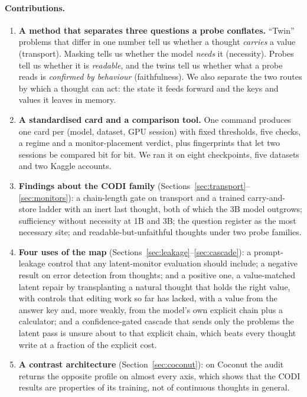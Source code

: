 \documentclass{article}
\begin{document}
\paragraph{Contributions.}
\begin{enumerate}
  \item \textbf{A method that separates three questions a probe conflates.} ``Twin'' problems that differ in one number tell us whether a thought \emph{carries} a value (transport). Masking tells us whether the model \emph{needs} it (necessity). Probes tell us whether it is \emph{readable}, and the twins tell us whether what a probe reads is \emph{confirmed by behaviour} (faithfulness). We also separate the two routes by which a thought can act: the state it feeds forward and the keys and values it leaves in memory.
  \item \textbf{A standardised card and a comparison tool.} One command produces one card per (model, dataset, GPU session) with fixed thresholds, five checks, a regime and a monitor-placement verdict, plus fingerprints that let two sessions be compared bit for bit. We ran it on eight checkpoints, five datasets and two Kaggle accounts.
  \item \textbf{Findings about the CODI family} (Sections~\ref{sec:transport}--\ref{sec:monitors}): a chain-length gate on transport and a trained carry-and-store ladder with an inert last thought, both of which the 3B model outgrows; sufficiency without necessity at 1B and 3B; the question register as the most necessary site; and readable-but-unfaithful thoughts under two probe families.
  \item \textbf{Four uses of the map} (Sections~\ref{sec:leakage}--\ref{sec:cascade}): a prompt-leakage control that any latent-monitor evaluation should include; a negative result on error detection from thoughts; and a positive one, a value-matched latent repair by transplanting a natural thought that holds the right value, with controls that editing work so far has lacked, with a value from the answer key and, more weakly, from the model's own explicit chain plus a calculator; and a confidence-gated cascade that sends only the problems the latent pass is unsure about to that explicit chain, which beats every thought write at a fraction of the explicit cost.
  \item \textbf{A contrast architecture} (Section~\ref{sec:coconut}): on Coconut the audit returns the opposite profile on almost every axis, which shows that the CODI results are properties of its training, not of continuous thoughts in general.
\end{enumerate}
\end{document}
